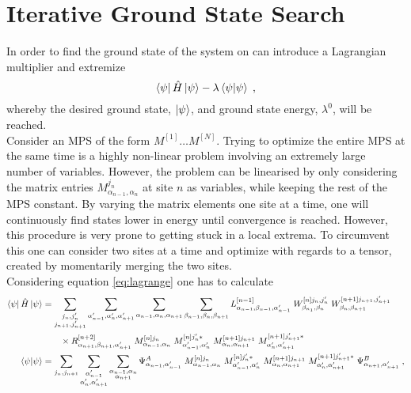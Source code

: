 \section{Iterative Ground State Search}
In order to find the ground state of the system on can introduce a Lagrangian multiplier and extremize
\begin{equation}
	\bra{\psi} \hat{H} \ket{\psi} - \lambda \braket{\psi | \psi} \; ,
	\label{eq:lagrange}
\end{equation}
whereby the desired ground state, $\ket{\psi}$, and ground state energy, $\lambda^0$, will be reached.\\
Consider an MPS of the form $M^{[1]} \ldots M^{[N]}$. Trying to optimize the entire MPS at the same time is a highly non-linear problem involving an extremely large number of variables. However, the problem can be linearised by only considering the matrix entries $M_{\alpha_{n-1}, \alpha_n}^{j_n}$ at site $n$ as variables, while keeping the rest of the MPS constant. By varying the matrix elements one site at a time, one will continuously find states lower in energy until convergence is reached. However, this procedure is very prone to getting stuck in a local extrema. To circumvent this one can consider two sites at a time and optimize with regards to a tensor, created by momentarily merging the two sites.\cite{WhiteDMRG} \\
Considering equation \ref{eq:lagrange} one has to calculate
\begin{align}
	\bra{\psi} \hat{H} \ket{\psi} &= \sum_{\substack{j_n , j_n ' \\ j_{n+1} , j_{n+1} '}} \sum_{\alpha_{n-1} ' , \alpha_n ', \alpha_{n+1} '} \sum_{\alpha_{n-1} , \alpha_n , \alpha_{n+1}} \sum_{\beta_{n-1} , \beta_n , \beta_{n+1}} L_{\alpha_{n-1}, \beta_{n-1} , \alpha_{n-1} '}^{[n-1]} \; W_{\beta_{n_1}, \beta_n}^{[n] j_n , j_n '} \; W_{\beta_{n}, \beta_{n+1}}^{[n+1] j_{n+1} , j_{n+1} '} \nonumber \\
	& \qquad \times R_{\alpha_{n+1} ,\beta_{n+1} , \alpha_{n+1} '}^{[n+2]} \; M_{\alpha_{n-1} , \alpha_{n}}^{[n] j_n } \; M_{\alpha_{n-1} ' , \alpha_{n} '}^{[n] j_n ' *} \; M_{\alpha_{n} , \alpha_{n+1}}^{[n+1] j_{n+1} } \; M_{\alpha_{n} ' , \alpha_{n+1} '}^{[n+1] j_{n+1} ' *}  \label{eq:twositeHamil}\\
	\braket{\psi | \psi} &= \sum_{j_n , j_{n+1} } \sum_{\substack{\alpha_{n-1} ' \\ \alpha_n ', \alpha_{n+1} '}} \sum_{\substack{\alpha_{n-1} , \alpha_n \\ \alpha_{n+1}}} \Psi_{\alpha_{n-1},\alpha_{n-1}'}^{A} \; M_{\alpha_{n-1} , \alpha_{n}}^{[n] j_n } \; M_{\alpha_{n-1} ' , \alpha_{n} '}^{[n] j_n ' *} \; M_{\alpha_{n} , \alpha_{n+1}}^{[n+1] j_{n+1} } \; M_{\alpha_{n} ' , \alpha_{n+1} '}^{[n+1] j_{n+1} ' *} \; \Psi_{\alpha_{n+1},\alpha_{n+1}'}^{B} \; , \label{eq:twositeOverlap}
\end{align}

